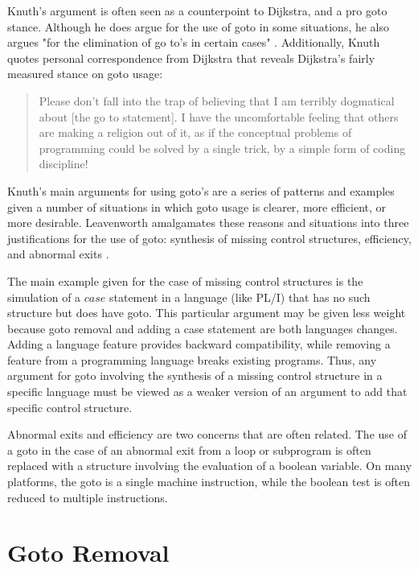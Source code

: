 \documentclass[letterpaper,12pt]{article}
\begin{document}
Knuth's argument is often seen as a counterpoint to Dijkstra, and a pro goto
stance.  Although he does argue for the use of goto in some situations, he
also argues "for the elimination of go to's in certain cases" \cite{knuth}.
Additionally, Knuth quotes personal correspondence from Dijkstra \cite{knuth} that
reveals Dijkstra's fairly measured stance on goto usage:

\begin{quote}
Please don't fall into the trap of believing that I am terribly dogmatical about
[the go to statement].  I have the uncomfortable feeling that
others are making a religion out of it, as if the conceptual problems of
programming could be solved by a single trick, by a simple form of coding
discipline!  \cite{dijkstra-personal}
\end{quote}

Knuth's main arguments for using goto's are a series of patterns and examples
given a number of situations in which goto usage is clearer, more efficient, or
more desirable.  Leavenworth amalgamates these reasons and situations into three
justifications for the use of goto: synthesis of missing control structures,
efficiency, and abnormal exits \cite{leavenworth}.

The main example given for the case of missing control structures is the
simulation of a $case$ statement in a language (like PL/I) that has no such
structure but does have goto.  This particular argument may be given less weight
because goto removal and adding a case statement are both languages changes.
Adding a language feature provides backward compatibility, while removing a
feature from a programming language breaks existing programs.
Thus, any argument for goto involving the synthesis of a missing
control structure in a specific language must be viewed as a weaker version of
an argument to add that specific control structure.

Abnormal exits and efficiency are two concerns that are often related.  The
use of a goto in the case of an abnormal exit from a loop or subprogram is
often replaced with a structure involving the evaluation of a boolean variable.
On many platforms, the goto is a single machine instruction, while the boolean
test is often reduced to multiple instructions.


\section{Goto Removal}
\end{document}
